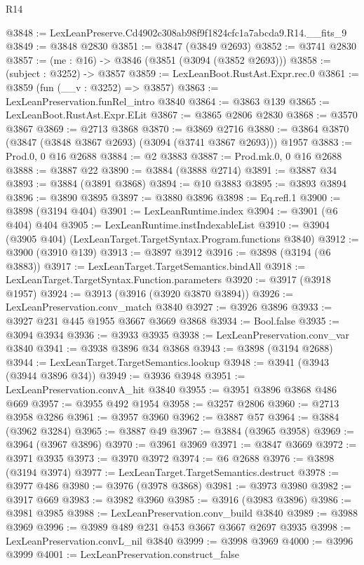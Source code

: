 \begin{lexlean}{R14}
\begin{coremodule}
@3848 := LexLeanPreserve.Cd4902c308ab98f9f1824cfc1a7abcda9.R14.__fits_9
@3849 := @3848 @2830
@3851 := @3847 (@3849 @2693)
@3852 := @3741 @2830
@3857 := (me : @16) -> @3846 (@3851 (@3094 (@3852 @2693)))
@3858 := (subject : @3252) -> @3857
@3859 := LexLeanBoot.RustAst.Expr.rec.{0}
@3861 := @3859 (fun (__v : @3252) => @3857)
@3863 := LexLeanPreservation.funRel_intro @3840
@3864 := @3863 @139
@3865 := LexLeanBoot.RustAst.Expr.ELit
@3867 := @3865 @2806 @2830
@3868 := @3570 @3867
@3869 := @2713 @3868
@3870 := @3869 @2716
@3880 := @3864 @3870 (@3847 (@3848 @3867 @2693) (@3094 (@3741 @3867 @2693))) @1957
@3883 := Prod.{0, 0} @16 @2688
@3884 := @2 @3883
@3887 := Prod.mk.{0, 0} @16 @2688
@3888 := @3887 @22
@3890 := @3884 (@3888 @2714)
@3891 := @3887 @34
@3893 := @3884 (@3891 @3868)
@3894 := @10 @3883
@3895 := @3893 @3894
@3896 := @3890 @3895
@3897 := @3880 @3896
@3898 := Eq.refl.{1}
@3900 := @3898 (@3194 @404)
@3901 := LexLeanRuntime.index
@3904 := @3901 (@6 @404) @404
@3905 := LexLeanRuntime.instIndexableList
@3910 := @3904 (@3905 @404) (LexLeanTarget.TargetSyntax.Program.functions @3840)
@3912 := @3900 (@3910 @139)
@3913 := @3897 @3912
@3916 := @3898 (@3194 (@6 @3883))
@3917 := LexLeanTarget.TargetSemantics.bindAll
@3918 := LexLeanTarget.TargetSyntax.Function.parameters
@3920 := @3917 (@3918 @1957)
@3924 := @3913 (@3916 (@3920 @3870 @3894))
@3926 := LexLeanPreservation.conv_match @3840
@3927 := @3926 @3896
@3933 := @3927 @231 @445 @1955 @3667 @3669 @3868
@3934 := Bool.false
@3935 := @3094 @3934
@3936 := @3933 @3935
@3938 := LexLeanPreservation.conv_var @3840
@3941 := @3938 @3896 @34 @3868
@3943 := @3898 (@3194 @2688)
@3944 := LexLeanTarget.TargetSemantics.lookup
@3948 := @3941 (@3943 (@3944 @3896 @34))
@3949 := @3936 @3948
@3951 := LexLeanPreservation.convA_hit @3840
@3955 := @3951 @3896 @3868 @486 @669
@3957 := @3955 @492 @1954
@3958 := @3257 @2806
@3960 := @2713 @3958 @3286
@3961 := @3957 @3960
@3962 := @3887 @57
@3964 := @3884 (@3962 @3284)
@3965 := @3887 @49
@3967 := @3884 (@3965 @3958)
@3969 := @3964 (@3967 @3896)
@3970 := @3961 @3969
@3971 := @3847 @3669
@3972 := @3971 @3935
@3973 := @3970 @3972
@3974 := @6 @2688
@3976 := @3898 (@3194 @3974)
@3977 := LexLeanTarget.TargetSemantics.destruct
@3978 := @3977 @486
@3980 := @3976 (@3978 @3868)
@3981 := @3973 @3980
@3982 := @3917 @669
@3983 := @3982 @3960
@3985 := @3916 (@3983 @3896)
@3986 := @3981 @3985
@3988 := LexLeanPreservation.conv_build @3840
@3989 := @3988 @3969
@3996 := @3989 @489 @231 @453 @3667 @3667 @2697 @3935
@3998 := LexLeanPreservation.convL_nil @3840
@3999 := @3998 @3969
@4000 := @3996 @3999
@4001 := LexLeanPreservation.construct_false

\end{coremodule}
\end{lexlean}

